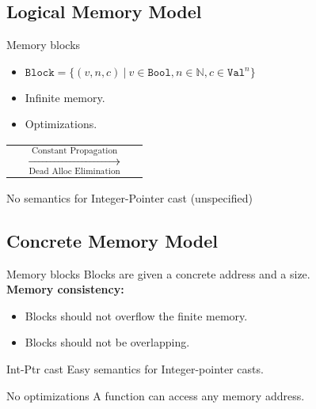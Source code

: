 \subsection{Logical Memory Model}
\begin{frame}{\subsecname}

  \begin{block}{Memory blocks}
    \begin{itemize}
    \item $\texttt{Block}=\{(v,n,c)~|~v\in\texttt{Bool},n\in\mathbb{N},c\in\texttt{Val}^{n}\}$
    \item Infinite memory.
    \item Optimizations.
    \end{itemize}
  \end{block}
  \vfill
  \begin{center}
    \begin{tabular}{l c r}
       &
      $\xrightarrow[\text{Dead Alloc Elimination}]{\text{Constant Propagation}}$ &
      
    \end{tabular}
  \end{center}
  \vfill
  \begin{alertblock}{No semantics for Integer-Pointer cast (unspecified)}
  \end{alertblock}
  
\end{frame}

\subsection{Concrete Memory Model}
\begin{frame}{\subsecname}

  \begin{block}{Memory blocks}
    Blocks are given a concrete address and a size.\\
    \textbf{Memory consistency:}
    \begin{itemize}
    \item Blocks should not overflow the finite memory.
    \item Blocks should not be overlapping.
    \end{itemize}
  \end{block}
  \vfill
  \begin{exampleblock}{Int-Ptr cast}
    Easy semantics for Integer-pointer casts.
  \end{exampleblock}
  \vfill
  \begin{alertblock}{No optimizations}
    A function can access any memory address.
  \end{alertblock}

\end{frame}

